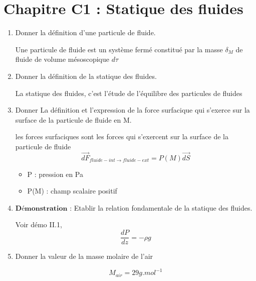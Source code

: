 \section*{\centering Chapitre C1 : Statique des fluides}
\begin{enumerate}[label=\arabic{enumi} - , left=0pt, itemsep=1em] %
    \item Donner la définition d'une particule de fluide. \par
    \begin{solution}
     Une particule de fluide est un système fermé constitué par la masse $\delta_M$ de fluide de volume mésoscopique $d\tau$
    \end{solution}

    \item Donner la définition de la statique des fluides. \par
    \begin{solution}
     La statique des fluides, c'est l'étude de l'équilibre des particules de fluides 
    \end{solution}

    \item Donner La définition et l'expression de la force surfacique qui s'exerce sur la surface de la particule de fluide en M. \par
    \begin{solution}
     les forces surfaciques sont les forces qui s'exercent sur la surface de la particule de fluide
          \[ \overrightarrow{dF}_{fluide-int \to fluide-ext} = P(M) \vec{dS}\]
         
          \begin{itemize}
               \tiny\item   P : pression en Pa
               \tiny\item   P(M) : champ scalaire positif
           \end{itemize}  
     \end{solution}

     \item $\textbf{Démonstration :}$ Etablir la relation fondamentale de la statique des fluides.\par
           \begin{solution}
               Voir démo II.1, \[ \frac{dP}{dz}=-\rho g \]
       
           \end{solution}
     
     \item Donner la valeur de la masse molaire de l'air\par
           \begin{solution}
               \[ M_{air} = 29 g.mol^{-1} \]
       

\end{solution}
\end{enumerate}
